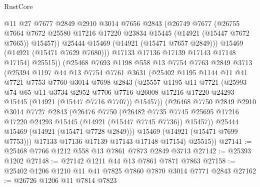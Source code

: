 \begin{lexlean}{RustCore}
\begin{coremodule}
                @11
                @27
                @7677
                @2849
                @2910
                @3014
                @7656
                @2843
                (@26749
                  @7677
                  (@26755
                    @7664
                    @7672
                    @25580
                    @17216
                    @17220
                    @23834
                    @15445
                    (@14921 (@15447 @7672 @7665))
                    @15457))
                @25444
                @15469
                (@14921 (@15471 @7657 @2849)))
              @15469
              (@14921 (@15471 @7629 @7680)))
            @17133
            @17136
            @17139
            @17143
            @17148
            @17154)
          @25515))
      (@25468
        @7693
        @1198
        @558
        @13
        @7754
        @7763
        @2849
        @3713
        (@25394
          @1197
          @44
          @13
          @7754
          @7761
          @3631
          (@25402
            @1195
            @1144
            @11
            @41
            @7721
            @7753
            @7760
            @3014
            @7698
            @2843
            (@25557
              @1195
              @11
              @7721
              (@25993
                @74
                @65
                @11
                @3734
                @2952
                @7706
                @7716
                @26008
                @17216
                @17220
                @24293
                @15445
                (@14921 (@15447 @7716 @7707))
                @15457))
            (@26468
              @7750
              @2849
              @2910
              @3014
              @7727
              @2843
              (@26476
                @7750
                (@26482
                  @7735
                  @7745
                  @25695
                  @17216
                  @17220
                  @24293
                  @15445
                  (@14921 (@15447 @7745 @7736))
                  @15457))
              @25444
              @15469
              (@14921 (@15471 @7728 @2849)))
            @15469
            (@14921 (@15471 @7699 @7753)))
          @17133
          @17136
          @17139
          @17143
          @17148
          @17154)
        @25515))
@27141 := @25468 @7766 @1212 @558 @13 @7861 @7873 @2849 @3713
@27142 := @25393 @1202
@27148 := @27142 @1211 @44 @13 @7861 @7871 @7863
@27158 := @25402 @1206 @1210 @11 @41 @7825 @7860 @7870 @3014 @7771 @2843
@27162 := @26726 @1206 @11 @7814 @7823

\end{coremodule}
\end{lexlean}

